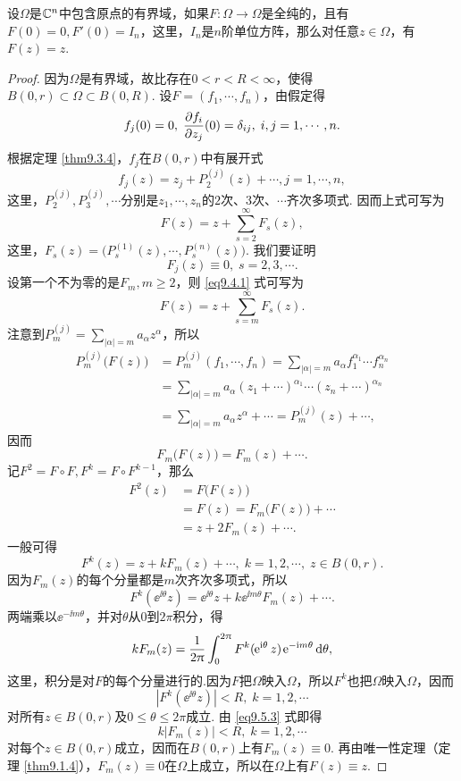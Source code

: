 \begin{theorem}\label{thm9.5.1}
设$\Omega$是$\mathbb C^n$中包含原点的有界域，如果$F:\Omega\to\Omega$是全纯的，且有$F(0)=0,F'(0)= I_n$，这里，$I_n$是$n$阶单位方阵，那么对任意$z\in\Omega$，有$F(z)=z$.
\end{theorem}
\begin{proof}
因为$\Omega$是有界域，故比存在$0<r<R<\infty$，使得$B(0,r)\subset\Omega\subset B(0,R)$. 设$F=(f_1,\cdots,f_n)$，由假定得
\[f_j(0)=0,\;\frac{\partial f_i}{\partial z_j}(0)=\delta_{ij},\;i,j=1,\cdots,n.\]
根据定理 \ref{thm9.3.4}，$f_j$在$B(0,r)$中有展开式
\[f_j(z)=z_j+P_2^{(j)}(z)+\cdots,j=1,\cdots,n,\]
这里，$P_2^{(j)},P_3^{(j)},\cdots$分别是$z_1,\cdots,z_n$的$2$次、$3$次、$\cdots$齐次多项式. 因而上式可写为
\begin{equation}\label{eq9.5.1}
F(z)=z+\sum_{s=2}^\infty F_s(z),
\end{equation}
这里，$F_s(z)=\big(P_s^{(1)}(z),\cdots,P_s^{(n)}(z)\big)$. 我们要证明
\[F_j(z)\equiv0,\;s=2,3,\cdots.\]
设第一个不为零的是$F_m,m\ge2$，则 \eqref{eq9.4.1} 式可写为
\begin{equation}\label{eq9.5.2}
F(z)=z+\sum_{s=m}^\infty F_s(z).
\end{equation}
注意到$P_m^{(j)}=\sum_{|\alpha|=m}a_\alpha z^\alpha$，所以
\begin{align*}
P_m^{(j)}\big(F(z)\big)&=P_m^{(j)}(f_1,\cdots,f_n)=\sum_{|\alpha|=m}a_\alpha
f_1^{\alpha_1}\cdots f_n^{\alpha_n}\\
&=\sum_{|\alpha|=m}a_\alpha(z_1+\cdots)^{\alpha_1}\cdots(z_n+\cdots)^{\alpha_n}\\
&=\sum_{|\alpha|=m}a_\alpha z^\alpha+\cdots=P_m^{(j)}(z)+\cdots,
\end{align*}
因而
\[F_m\big(F(z)\big)=F_m(z)+\cdots.\]
记$F^2=F\circ F,F^k=F\circ F^{k-1}$，那么
\begin{align*}
F^2(z)&=F\big(F(z)\big)\\
&=F(z)=F_m\big(F(z)\big)+\cdots\\
&=z+2F_m(z)+\cdots.
\end{align*}
一般可得
\[F^k(z)=z+kF_m(z)+\cdots,\;k=1,2,\cdots,\;z\in B(0,r).\]
因为$F_m(z)$的每个分量都是$m$次齐次多项式，所以
\[F^k(\ee^{\ii\theta}z)=\ee^{\ii\theta}z+k\ee^{\ii m\theta}F_m(z)+\cdots.\]
两端乘以$\ee^{-\ii m\theta}$，并对$\theta$从$0$到$2\pi$积分，得
\begin{equation}\label{eq9.5.3}
kF_m(z)=\frac1{2\uppi}\int_0^{2\uppi}F^k(\operatorname{\!\!\;\textrm e}^{\textrm i\theta}z)\operatorname{\!\!\;\textrm e}^{-\textrm i m\theta}\textrm d\theta,
\end{equation}
这里，积分是对$F$的每个分量进行的.因为$F$把$\Omega$映入$\Omega$，所以$F^k$也把$\Omega$映入$\Omega$，因而
\[|F^k(\ee^{\ii\theta}z)|<R,\;k=1,2,\cdots\]
对所有$z\in B(0,r)$及$0\le\theta\le2\pi$成立. 由 \eqref{eq9.5.3} 式即得
\[k|F_m(z)|<R,\;k=1,2,\cdots\]
对每个$z\in B(0,r)$成立，因而在$B(0,r)$上有$F_m(z)\equiv0$. 再由唯一性定理（定理 \ref{thm9.1.4}），$F_m(z)\equiv0$在$\Omega$上成立，所以在$\Omega$上有$F(z)\equiv z$.
\end{proof}


